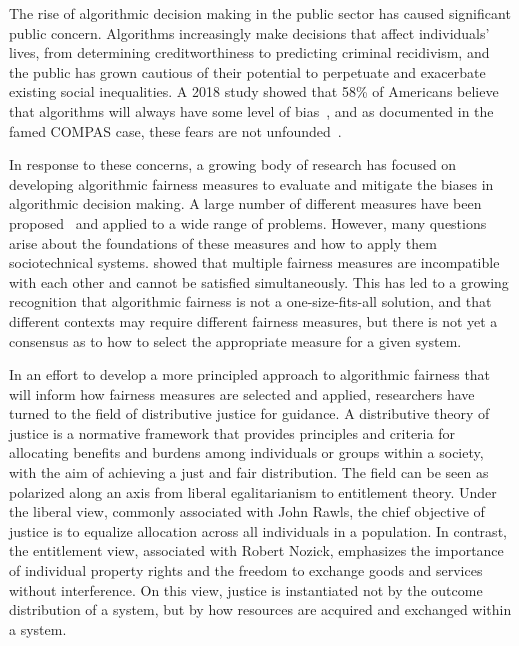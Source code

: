 
The rise of algorithmic decision making in the public sector has caused
significant public concern. Algorithms increasingly make decisions that affect
individuals' lives, from determining creditworthiness to predicting criminal 
recidivism, and the public has grown cautious of their potential to perpetuate
and exacerbate existing social inequalities. A 2018 study showed that 58\% of
Americans believe that algorithms will always have some level of
bias~\citep{Smith_2018}, and as documented in the famed COMPAS case, these fears
are not unfounded~\citep{Angwin_2016}.

In response to these concerns, a growing body of research has focused on
developing algorithmic fairness measures to evaluate and mitigate the biases
in algorithmic decision making. A large number of different measures have been
proposed~\citep{CorbettDavies_2023} and applied to a wide range of problems.
However, many questions arise about the foundations of these measures and how to
apply them sociotechnical systems. \citep{Hardt_2016} showed that multiple
fairness measures are incompatible with each other and cannot be satisfied
simultaneously. This has led to a growing recognition that algorithmic fairness
is not a one-size-fits-all solution, and that different contexts may require
different fairness measures, but there is not yet a consensus as to how to
select the appropriate measure for a given system.

In an effort to develop a more principled approach to algorithmic fairness that
will inform how fairness measures are selected and applied,
researchers have turned to the field of distributive justice for guidance.
A distributive theory of justice is a normative framework that provides
principles and criteria for allocating benefits and burdens among individuals or
groups within a society, with the aim of achieving a just and fair distribution.
The field can be seen as polarized along an axis from liberal egalitarianism to
entitlement theory. Under the liberal view, commonly associated with John Rawls, 
the chief objective of justice is to equalize allocation across all individuals
in a population. In contrast, the entitlement view, associated with Robert
Nozick, emphasizes the importance of individual property rights and the freedom
to exchange goods and services without interference. On this view, justice is
instantiated not by the outcome distribution of a system, but by how resources
are acquired and exchanged within a system.

